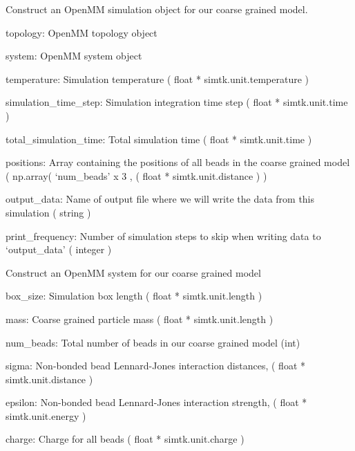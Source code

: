 \documentclass[letterpaper,10pt,english]{sphinxmanual}
\begin{document}
\begin{fulllineitems}
\label{\detokenize{openmm:openmm.build_mm_simulation}}
Construct an OpenMM simulation object for our coarse grained model.

topology: OpenMM topology object

system: OpenMM system object

temperature: Simulation temperature ( float * simtk.unit.temperature )

simulation\_time\_step: Simulation integration time step
( float * simtk.unit.time )

total\_simulation\_time: Total simulation time ( float * simtk.unit.time )

positions: Array containing the positions of all beads
in the coarse grained model
( np.array( ‘num\_beads’ x 3 , ( float * simtk.unit.distance ) )

output\_data: Name of output file where we will write the data from this
simulation ( string )

print\_frequency: Number of simulation steps to skip when writing data
to ‘output\_data’ ( integer )

\end{fulllineitems}


\begin{fulllineitems}
\label{\detokenize{openmm:openmm.build_mm_system}}
Construct an OpenMM system for our coarse grained model

box\_size: Simulation box length ( float * simtk.unit.length )

mass: Coarse grained particle mass ( float * simtk.unit.length )

num\_beads: Total number of beads in our coarse grained model (int)

sigma: Non-bonded bead Lennard-Jones interaction distances,
( float * simtk.unit.distance )

epsilon: Non-bonded bead Lennard-Jones interaction strength,
( float * simtk.unit.energy )

charge: Charge for all beads
( float * simtk.unit.charge )

\end{fulllineitems}
\end{document}
